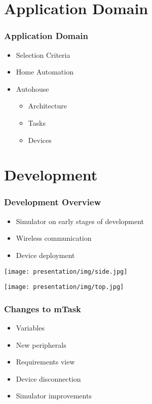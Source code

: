 \documentclass[department=icis, notes={show notes}, slidesperpage=1, official=true,showdate=true,slidenumbers=relative]{beamerruhuisstijl}
\begin{document}
\section{Application Domain}
\begin{frame}[fragile]
    \frametitle{Application Domain}
    \begin{itemize}
        \setlength\itemsep{1em}
        \item Selection Criteria
        \item Home Automation
        \item Autohouse
        \begin{itemize}[label=$\diamond$]
            \item Architecture
            \item Tasks
            \item Devices
        \end{itemize}
    \end{itemize}
\end{frame}

\section{Development}
\begin{frame}[fragile]
    \frametitle{Development Overview}
    \begin{itemize}
        \item Simulator on early stages of development
        \item Wireless communication
        \item Device deployment
    \end{itemize}
\end{frame}

\begin{frame}[fragile,c]
    \texttt{[image: presentation/img/side.jpg]}
\end{frame}

\begin{frame}[fragile,c]
    \texttt{[image: presentation/img/top.jpg]}
\end{frame}


\begin{frame}[fragile]
    \frametitle{Changes to mTask}
    \begin{itemize}
        \setlength\itemsep{1em}
        \item Variables
        \item New peripherals
        \item Requirements view
        \item Device disconnection
        \item Simulator improvements
    \end{itemize}
\end{frame}
\end{document}
